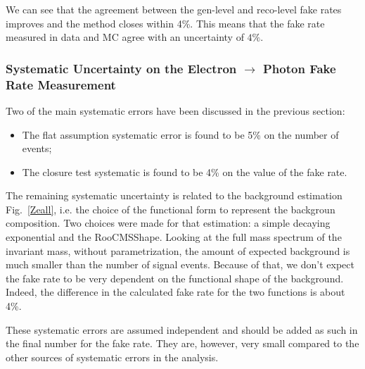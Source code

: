 
We can see that the agreement between the gen-level and reco-level fake rates improves and the method closes within 4\%. This means that the fake rate measured in data and MC agree with an uncertainty of $4\%$.

\subsubsection{Systematic Uncertainty on the Electron $\rightarrow$ Photon Fake Rate Measurement}
Two of the main systematic errors have been discussed in the previous section:

\begin{itemize}
\item The flat assumption systematic error is found to be 5\% on the number of events;
\item The closure test systematic is found to be 4\% on the value of the fake rate.
\end{itemize}

The remaining systematic uncertainty is related to the background estimation Fig.~\ref{Zeall}, i.e. the choice of the functional form to represent the backgroun composition. Two choices were made for that estimation: a simple decaying exponential and the RooCMSShape. Looking at the full mass spectrum of the invariant mass, without parametrization, the amount of expected background is much smaller than the number of signal events. Because of that, we don't expect the fake rate to be very dependent on the functional shape of the background. Indeed, the difference in the calculated fake rate for the two functions is about 4\%.

These systematic errors are assumed independent and should be added as such in the final number for the fake rate. They are, however, very small compared to the other sources of systematic errors in the analysis.
